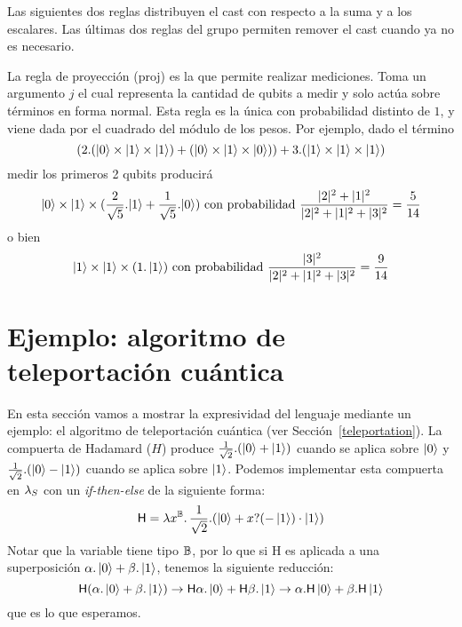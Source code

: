 Las siguientes dos reglas distribuyen el cast con respecto a la suma y a los escalares. Las últimas dos reglas del grupo permiten remover el cast cuando ya no es necesario.

La regla de proyección (\textsf{proj}) es la que permite realizar mediciones. Toma un argumento \( j \) el cual representa la cantidad de qubits a medir y solo actúa sobre términos en forma normal. Esta regla es la única con probabilidad distinto de \( 1 \), y viene dada por el cuadrado del módulo de los pesos. Por ejemplo, dado el término
\[ (2.(\ket{0} \times \ket{1} \times \ket{1}) + (\ket{0} \times \ket{1} \times \ket{0})) + 3.(\ket{1} \times \ket{1} \times \ket{1}) \]
medir los primeros 2 qubits producirá
\[ \ket{0} \times \ket{1} \times (\frac{2}{\sqrt{5}} .\!\ket{1} + \frac{1}{\sqrt{5}} .\!\ket{0}) \text{ con probabilidad } \frac{|2|^2 + |1|^2}{|2|^2 + |1|^2 + |3|^2} = \frac{5}{14} \]
o bien
\[ \ket{1} \times \ket{1} \times (1 . \ket{1}) \text{ con probabilidad } \frac{|3|^2}{|2|^2 + |1|^2 + |3|^2} = \frac{9}{14} \]

\section{Ejemplo: algoritmo de teleportación cuántica}

En esta sección vamos a mostrar la expresividad del lenguaje mediante un ejemplo: el algoritmo de teleportación cuántica (ver Sección~\ref{teleportation}).
La compuerta de Hadamard (\( H \)) produce \( \frac{1}{\sqrt{2}} . (\ket{0} + \ket{1}) \) cuando se aplica sobre \( \ket{0} \) y \( \frac{1}{\sqrt{2}} . (\ket{0} - \ket{1}) \) cuando se aplica sobre \( \ket{1} \). Podemos implementar esta compuerta en \( \lambda_S \) con un \textit{if-then-else} de la siguiente forma:
\[
	\mathsf{H} = \lambda x^{\mathbb{B}}\ldotp\frac{1}{\sqrt{2}} . (\ket{0} + x? (- \ket{1}) \cdot \ket{1})
\]
Notar que la variable tiene tipo \( \mathbb{B} \), por lo que si \textsf{H} es aplicada a una superposición \( \alpha . \ket{0} + \beta . \ket{1} \), tenemos la siguiente reducción:
\[
	\mathsf{H} (\alpha . \ket{0} + \beta . \ket{1}) \rightarrow \mathsf{H} \alpha .  \ket{0} + \mathsf{H} \beta . \ket{1} \rightarrow \alpha . \mathsf{H} \ket{0} + \beta . \mathsf{H} \ket{1}
\]
que es lo que esperamos.

